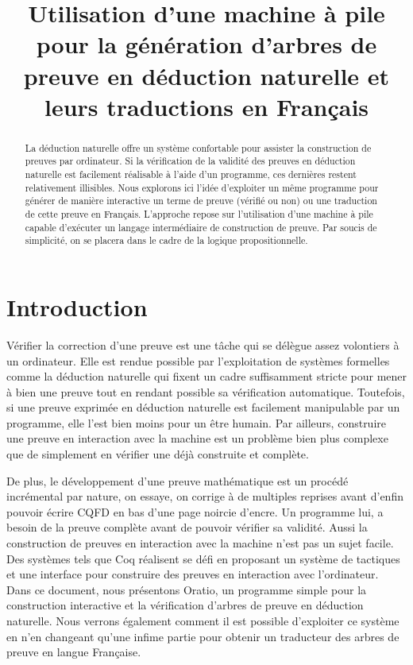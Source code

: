 \documentclass{article}
\begin{document}
\title{Utilisation d'une machine à pile pour la génération d'arbres de preuve en déduction naturelle et leurs traductions en Français}
\maketitle

\begin{abstract}
  La déduction naturelle offre un système confortable pour assister la construction de preuves par ordinateur. Si la vérification de la validité des preuves en déduction naturelle est facilement réalisable à l'aide d'un programme, ces dernières restent relativement illisibles. Nous explorons ici l'idée d'exploiter un même programme pour générer de manière interactive un terme de preuve (vérifié ou non) ou une traduction de cette preuve en Français. L'approche repose sur l'utilisation d'une machine à pile capable d'exécuter un langage intermédiaire de construction de preuve. Par soucis de simplicité, on se placera dans le cadre de la logique propositionnelle.
\end{abstract}

\section{Introduction}

Vérifier la correction d'une preuve est une tâche qui se délègue assez volontiers à un ordinateur. Elle est rendue possible par l'exploitation de systèmes formelles comme la déduction naturelle qui fixent un cadre suffisamment stricte pour mener à bien une preuve tout en rendant possible sa vérification automatique. Toutefois, si une preuve exprimée en déduction naturelle est facilement manipulable par un programme, elle l'est bien moins pour un être humain. Par ailleurs, construire une preuve en interaction avec la machine est un problème bien plus complexe que de simplement en vérifier une déjà construite et complète.

De plus, le développement d'une preuve mathématique est un procédé incrémental par nature, on essaye, on corrige à de multiples reprises avant d'enfin pouvoir écrire CQFD en bas d'une page noircie d'encre. Un programme lui, a besoin de la preuve complète avant de pouvoir vérifier sa validité. Aussi la construction de preuves en interaction avec la machine n'est pas un sujet facile. Des systèmes tels que Coq réalisent se défi en proposant un système de tactiques et une interface pour construire des preuves en interaction avec l'ordinateur. Dans ce document, nous présentons Oratio, un programme simple pour la construction interactive et la vérification d'arbres de preuve en déduction naturelle. Nous verrons également comment il est possible d'exploiter ce système en n'en changeant qu'une infime partie pour obtenir un traducteur des arbres de preuve en langue Française.
\end{document}
